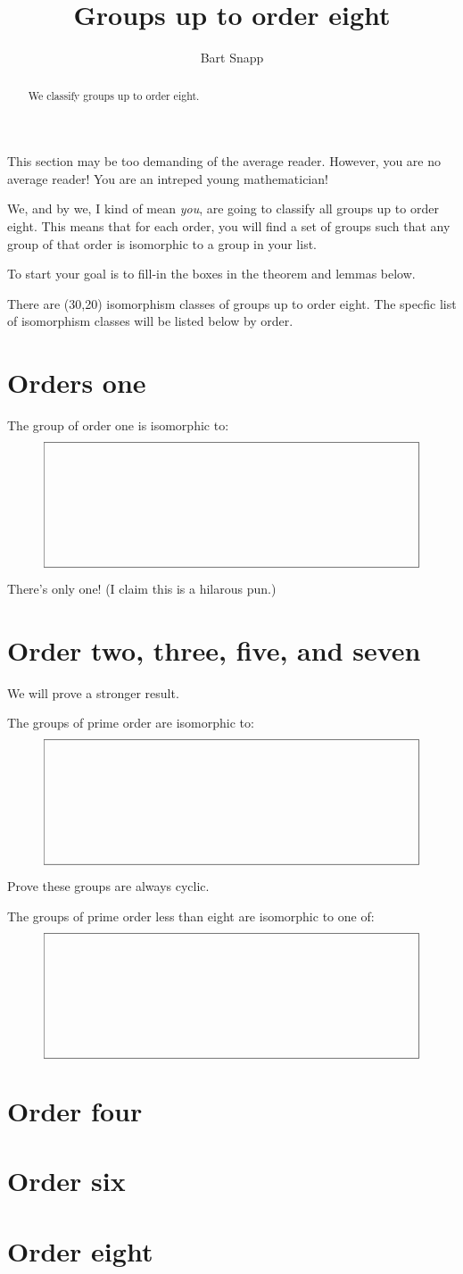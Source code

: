 \documentclass{ximera}
\author{Bart Snapp}
\title{Groups up to order eight}
\begin{document}
\begin{abstract}
  We classify groups up to order eight.
\end{abstract}
\maketitle

This section may be too demanding of the average reader. However, you
are no average reader! You are an intreped young mathematician!

We, and by we, I kind of mean \textit{you}, are going to classify all
groups up to order eight. This means that for each order, you will
find a set of groups such that any group of that order is isomorphic
to a group in your list.

To start your goal is to fill-in the boxes in the theorem and lemmas
below.

\begin{theorem}
  There are \framebox(30,20){} isomorphism classes of groups up to
  order eight. The specfic list of isomorphism classes will be listed
  below by order.
\end{theorem}


\section{Orders one}

\begin{lemma}
  The group of order one is isomorphic to:
  \[
  \framebox(300,100){}
  \]
  \begin{sketch}
    There's only one! (I claim this is a hilarous pun.)
  \end{sketch}
\end{lemma}

\section{Order two, three, five, and seven}

We will prove a stronger result.

\begin{lemma}
  The groups of prime order are isomorphic to:
  \[
  \framebox(300,100){}
  \]
  \begin{sketch}
    Prove these groups are always cyclic.
  \end{sketch}
\end{lemma}

\begin{corollary}
  The groups of prime order less than eight are isomorphic to one of:
  \[
  \framebox(300,100){}
  \]
\end{corollary}

\section{Order four}

\section{Order six}

\section{Order eight}
\end{document}
